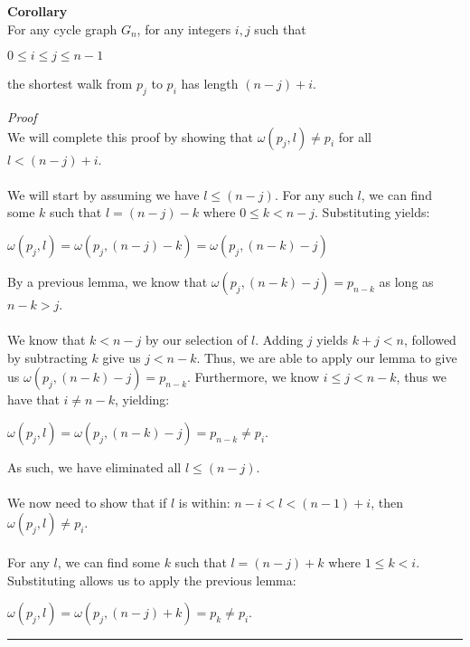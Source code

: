 \documentclass[a4paper,12pt]{article}
\begin{document}
\begin{tcolorbox}
\textbf{Corollary}\\
For any cycle graph $G_n$, for any integers $i, j$ such that
\begin{center}
$0 \leq i \leq j \leq n - 1$
\end{center}
the shortest walk from $p_j$ to $p_i$ has length $(n - j) + i$.
\end{tcolorbox}
\noindent
\textit{Proof}\\
We will complete this proof by showing that $\omega(p_j, l) \neq p_i$ for all $l < (n - j) + i$.\\
\\
We will start by assuming we have $l \leq (n - j)$. For any such $l$, we can find some $k$ such that $l = (n - j) - k$ where $0 \leq k < n - j$. Substituting yields:
\begin{center}
$\omega(p_j, l) = \omega(p_j, (n - j) - k) = \omega(p_j, (n - k) - j)$
\end{center}
By a previous lemma, we know that $\omega(p_j, (n - k) - j) = p_{n - k}$ as long as $n - k > j$.\\
\\
We know that $k < n - j$ by our selection of $l$. Adding $j$ yields $k + j < n$, followed by subtracting $k$ give us $j < n - k$. Thus, we are able to apply our lemma to give us $\omega(p_j, (n - k) - j) = p_{n - k}$. Furthermore, we know $i \leq j < n - k$, thus we have that $i \neq n - k$, yielding:
\begin{center}
$\omega(p_j, l) = \omega(p_j, (n - k) - j) = p_{n-k} \neq p_i$.
\end{center}
As such, we have eliminated all $l \leq (n - j)$.\\
\\
We now need to show that if $l$ is within: $n - i < l < (n-1) + i$, then $\omega(p_j, l) \neq p_i$.\\
\\
For any $l$, we can find some $k$ such that $l = (n - j) + k$ where $1 \leq k < i$. Substituting allows us to apply the previous lemma:
\begin{center}
$\omega(p_j, l) = \omega(p_j, (n - j) + k) = p_k \neq p_i$.
\end{center}

\begin{center}
\noindent\rule{8cm}{0.4pt}
\end{center}
\end{document}
